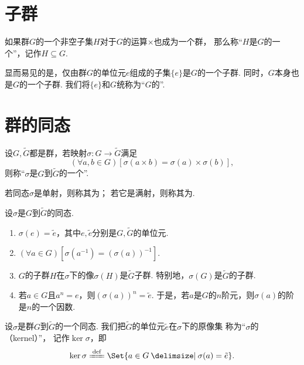 \section{子群}
\begin{definition}
如果群\(G\)的一个非空子集\(H\)对于\(G\)的运算\(\times\)也成为一个群，
那么称“\(H\)是\(G\)的一个”，记作\(H \subseteq G\).
\end{definition}

显而易见的是，仅由群\(G\)的单位元\(e\)组成的子集\(\{e\}\)是\(G\)的一个子群.
同时，\(G\)本身也是\(G\)的一个子群.
我们将\(\{e\}\)和\(G\)统称为“\(G\)的”.

\section{群的同态}
\begin{definition}
设\(G,\tilde{G}\)都是群，若映射\(\sigma\colon G \to \tilde{G}\)满足\[
	(\forall a,b \in G)[\sigma(a \times b) = \sigma(a) \times \sigma(b)],
\]
则称“\(\sigma\)是\(G\)到\(\tilde{G}\)的一个”.

若同态\(\sigma\)是单射，则称其为；
若它是满射，则称其为.
\end{definition}

\begin{property}
设\(\sigma\)是\(G\)到\(\tilde{G}\)的同态.
\begin{enumerate}
	\item \(\sigma(e)=\tilde{e}\)，其中\(e,\tilde{e}\)分别是\(G,\tilde{G}\)的单位元.
	\item \((\forall a \in G)[\sigma(a^{-1})=(\sigma(a))^{-1}]\).
	\item \(G\)的子群\(H\)在\(\sigma\)下的像\(\sigma(H)\)是\(\tilde{G}\)子群.
	特别地，\(\sigma(G)\)是\(\tilde{G}\)的子群.
	\item 若\(a \in G\)且\(a^n = e\)，则\((\sigma(a))^n = \tilde{e}\).
	于是，若\(a\)是\(G\)的\(n\)阶元，则\(\sigma(a)\)的阶是\(n\)的一个因数.
\end{enumerate}
\end{property}

\begin{definition}
设\(\sigma\)是群\(G\)到\(\tilde{G}\)的一个同态.
我们把\(\tilde{G}\)的单位元\(\tilde{e}\)在\(\sigma\)下的原像集%
称为“\(\sigma\)的（kernel）”，
记作\(\ker\sigma\)，即\[
	\ker\sigma \defeq \Set{ a \in G \given \sigma(a) = \tilde{e} }.
\]
\end{definition}

